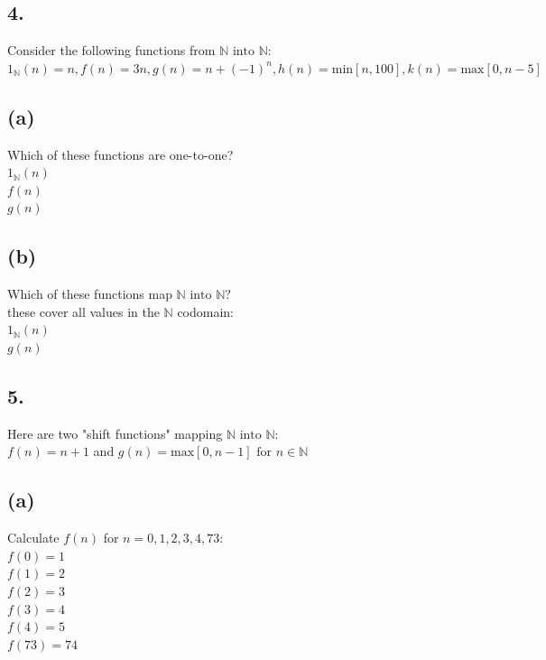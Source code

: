 \documentclass[11pt]{article}
\begin{document}
\subsection*{4.}
\begin{center}
Consider the following functions from $\mathbb{N} \text{ into } \mathbb{N}$:\\
$1_{\mathbb{N}}(n) = n, f(n) = 3n, g(n) = n + (-1)^{n}, h(n) = \text{min}[n, 100], k(n) = \text{max}[0, n - 5]$
\end{center}

\subsection*{(a)}
\begin{center}
Which of these functions are one-to-one?\\
\hfill \break
$1_{\mathbb{N}}(n)$\\
$f(n)$\\
$g(n)$
\end{center}

\subsection*{(b)}
\begin{center}
Which of these functions map $\mathbb{N} \text{ into } \mathbb{N}$?\\
\hfill \break
these cover all values in the $\mathbb{N}$ codomain:\\
$1_{\mathbb{N}}(n)$\\
$g(n)$
\end{center}
%
%
\subsection*{5.}
\begin{center}
Here are two "shift functions" mapping $\mathbb{N} \text{ into } \mathbb{N}$:\\
$f(n) = n + 1$ and $g(n) = \text{max}[0,n - 1] \text{ for } n \in \mathbb{N}$
\end{center}

\subsection*{(a)}
\begin{center}
Calculate $f(n)$ for $n = 0,1,2,3,4,73$:\\
\hfill \break
$f(0) = 1$\\
$f(1) = 2$\\
$f(2) = 3$\\
$f(3) = 4$\\
$f(4) = 5$\\
$f(73) = 74$
\end{center}
\end{document}
